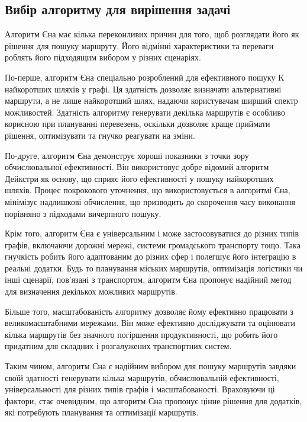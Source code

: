 \subsection{Вибір алгоритму для вирішення задачі}
\label{subsec:bfs-subsection}


Алгоритм Єна має кілька переконливих причин для того, щоб розглядати його як рішення для пошуку маршруту. Його відмінні характеристики та переваги роблять його підходящим вибором у різних сценаріях.

По-перше, алгоритм Єна спеціально розроблений для ефективного пошуку K найкоротших шляхів у графі. Ця здатність дозволяє визначати альтернативні маршрути, а не лише найкоротший шлях, надаючи користувачам ширший спектр можливостей. Здатність алгоритму генерувати декілька маршрутів є особливо корисною при плануванні перевезень, оскільки дозволяє краще приймати рішення, оптимізувати та гнучко реагувати на зміни.

По-друге, алгоритм Єна демонструє хороші показники з точки зору обчислювальної ефективності. Він використовує добре відомий алгоритм Дейкстри як основу, що сприяє його ефективності у пошуку найкоротших шляхів. Процес покрокового уточнення, що використовується в алгоритмі Єна, мінімізує надлишкові обчислення, що призводить до скорочення часу виконання порівняно з підходами вичерпного пошуку.

Крім того, алгоритм Єна є універсальним і може застосовуватися до різних типів графів, включаючи дорожні мережі, системи громадського транспорту тощо. Така гнучкість робить його адаптованим до різних сфер і полегшує його інтеграцію в реальні додатки. Будь то планування міських маршрутів, оптимізація логістики чи інші сценарії, пов'язані з транспортом, алгоритм Єна пропонує надійний метод для визначення декількох можливих маршрутів.

Більше того, масштабованість алгоритму дозволяє йому ефективно працювати з великомасштабними мережами. Він може ефективно досліджувати та оцінювати кілька маршрутів без значного погіршення продуктивності, що робить його придатним для складних і розгалужених транспортних систем.

Таким чином, алгоритм Єна є надійним вибором для пошуку маршрутів завдяки своїй здатності генерувати кілька маршрутів, обчислювальній ефективності, універсальності для різних типів графів і масштабованості. Враховуючи ці фактори, стає очевидним, що алгоритм Єна пропонує цінне рішення для додатків, які потребують планування та оптимізації маршрутів.